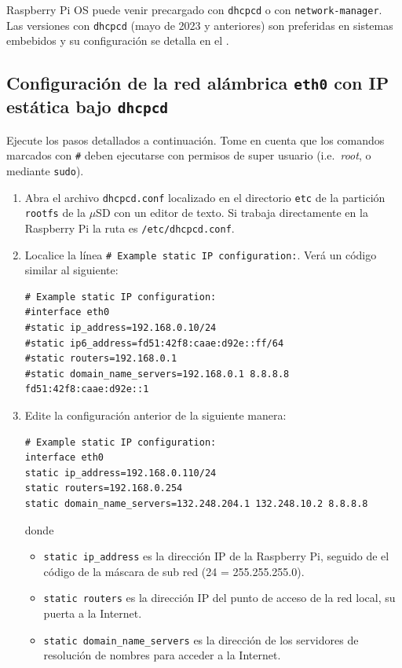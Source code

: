 \documentclass[letterpaper,10.5pt]{article}
\begin{document}
Raspberry Pi OS puede venir precargado con \texttt{dhcpcd} o con \texttt{network-manager}.
Las versiones con \texttt{dhcpcd} (mayo de 2023 y anteriores) son preferidas en sistemas embebidos y su configuración se detalla en el .

\subsection{Configuración de la red alámbrica \texttt{eth0} con IP estática bajo \texttt{dhcpcd}}%
\label{sec:setup-eth0-dhcpcd}

Ejecute los pasos detallados a continuación.
Tome en cuenta que los comandos marcados con \texttt{\#} deben ejecutarse con permisos de super usuario (i.e.~\emph{root}, o mediante \texttt{sudo}).

\begin{enumerate}
	\item Abra el archivo \texttt{dhcpcd.conf} localizado en el directorio \texttt{etc} de la partición \texttt{rootfs} de la $\mu$SD con un editor de texto.
	Si trabaja directamente en la Raspberry Pi la ruta es \texttt{/etc/dhcpcd.conf}.

	\item Localice la línea \texttt{\# Example static IP configuration:}. Verá un código similar al siguiente:

\begin{Verbatim}[fontsize=\footnotesize]
# Example static IP configuration:
#interface eth0
#static ip_address=192.168.0.10/24
#static ip6_address=fd51:42f8:caae:d92e::ff/64
#static routers=192.168.0.1
#static domain_name_servers=192.168.0.1 8.8.8.8 fd51:42f8:caae:d92e::1
\end{Verbatim}

	\item Edite la configuración anterior de la siguiente manera:
\begin{Verbatim}[fontsize=\footnotesize]
# Example static IP configuration:
interface eth0
static ip_address=192.168.0.110/24
static routers=192.168.0.254
static domain_name_servers=132.248.204.1 132.248.10.2 8.8.8.8
\end{Verbatim}
	donde
	\begin{itemize}
		\item \texttt{static ip\_address} es la dirección IP de la Raspberry Pi, seguido de el código de la máscara de sub red (24 = 255.255.255.0).
		\item \texttt{static routers} es la dirección IP del punto de acceso de la red local, su puerta a la Internet.
		\item \texttt{static domain\_name\_servers} es la dirección de los servidores de resolución de nombres para acceder a la Internet.
	\end{itemize}
\end{enumerate}
\end{document}
